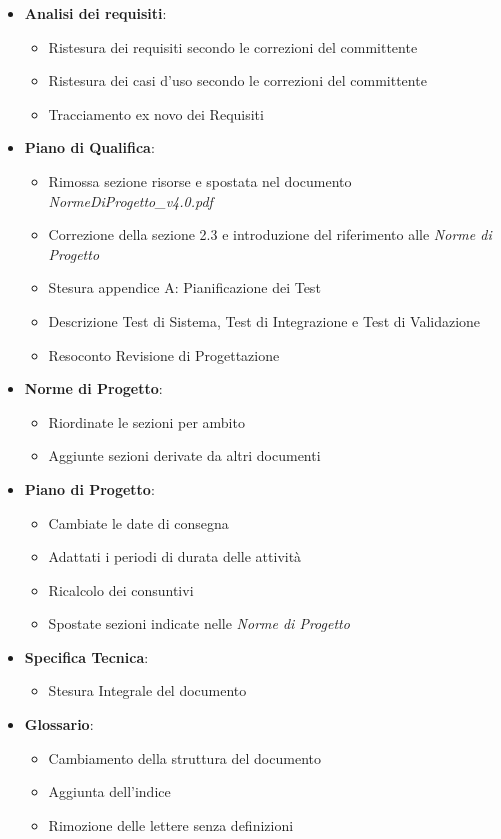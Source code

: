 \begin{itemize}
	\item \textbf{Analisi dei requisiti}:
	\begin{itemize}
		\item Ristesura dei requisiti secondo le correzioni del committente
		\item Ristesura dei casi d'uso secondo le correzioni del committente
		\item Tracciamento ex novo dei Requisiti
	\end{itemize}
	\item \textbf{Piano di Qualifica}:
	\begin{itemize}
		\item Rimossa sezione risorse e spostata nel documento \textit{NormeDiProgetto\_v4.0.pdf}
		\item Correzione della sezione 2.3 e introduzione del riferimento alle \textit{Norme di Progetto}
		\item Stesura appendice A: Pianificazione dei Test
		\item Descrizione Test di Sistema, Test di Integrazione e Test di Validazione
		\item Resoconto Revisione di Progettazione
	\end{itemize}
	\item \textbf{Norme di Progetto}:
	\begin{itemize}
		\item Riordinate le sezioni per ambito
		\item Aggiunte sezioni derivate da altri documenti
	\end{itemize}
	\item \textbf{Piano di Progetto}:
	\begin{itemize}
		\item Cambiate le date di consegna
		\item Adattati i periodi di durata delle attività
		\item Ricalcolo dei consuntivi
		\item Spostate sezioni indicate nelle \textit{Norme di Progetto}
	\end{itemize}	
	\item \textbf{Specifica Tecnica}:
	\begin{itemize}
		\item Stesura Integrale del documento
	\end{itemize}	
	\item \textbf{Glossario}:
	\begin{itemize}
		\item Cambiamento della struttura del documento
		\item Aggiunta dell'indice
		\item Rimozione delle lettere senza definizioni
	\end{itemize}
\end{itemize}
\newpage
